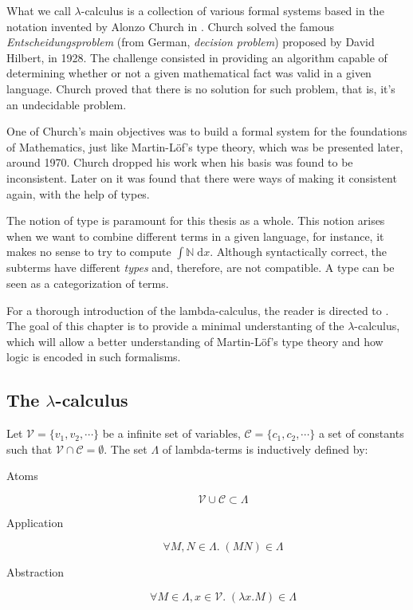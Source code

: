 What we call $\lambda$-calculus is a collection of various formal systems based 
in the notation invented by Alonzo Church in \cite{Church01,Church02}. 
Church solved the famous \textit{Entscheidungsproblem} (from German, \textit{decision problem}) 
proposed by David Hilbert, in 1928. The challenge consisted in providing an algorithm capable
of determining whether or not a given mathematical fact was valid in a given language. 
Church proved that there is no solution for such problem, that is, it's an undecidable problem.

One of Church's main objectives was to build a formal system for the foundations of
Mathematics, just like Martin-Löf's type theory, which was be presented later, around 1970. 
Church dropped his work when his basis was found to be inconsistent. Later on it was found
that there were ways of making it consistent again, with the help of types.

The notion of type is paramount for this thesis as a whole. This notion arises when we want 
to combine different terms in a given language, for instance, it makes no sense to try
to compute $\int \mathbb{N}\;\mathrm{d}x$. Although syntactically correct, the subterms have
different \emph{types} and, therefore, are not compatible. A type can be seen as a
categorization of terms.

For a thorough introduction of the lambda-calculus, the reader is directed to \cite{Barendregt01,Hindley01}.
The goal of this chapter is to provide a minimal understanting of the $\lambda$-calculus, which
will allow a better understanding of Martin-L\"{o}f's type theory and how logic is encoded
in such formalisms.

\subsection{The $\lambda$-calculus}

\begin{mydef} Let $\mathcal{V} = \{v_1, v_2, \cdots\}$ be a infinite set of
variables, $\mathcal{C}=\{c_1, c_2, \cdots\}$ a set of constants such that 
$\mathcal{V} \cap \mathcal{C} = \emptyset$. The set $\Lambda$ of lambda-terms is 
inductively defined by:
\begin{description}
  \item[Atoms]
        \[ \mathcal{V} \cup \mathcal{C} \subset \Lambda \]
  \item[Application]  
        \[ \forall M, N \in \Lambda.\; (M N) \in \Lambda \]
  \item[Abstraction]
        \[ \forall M \in \Lambda, x \in \mathcal{V}.\; (\lambda x . M) \in \Lambda \]
\end{description}
\end{mydef}

